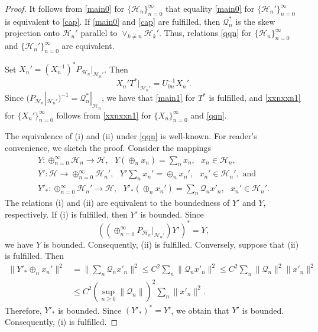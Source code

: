 \documentclass[a4paper,oneside,11pt]{amsart}
\numberwithin{equation}{section}
\theoremstyle{plain}
\theoremstyle{definition}
\begin{document}
\begin{proof}  It follows from   \eqref{main0} for  $\{\mathcal H_n\}_{n=0}^\infty$  that equality  
  \eqref{main0} for  $\{\mathcal H_n'\}_{n=0}^\infty$ is equivalent to \eqref{cap}.  
If   \eqref{main0}  and \eqref{cap} are fulfilled, then  $\mathcal Q_n^*$ is the skew projection onto $\mathcal H_n'$  parallel to $\vee_{k\neq n}\mathcal H_k'$. Thus, 
 relations \eqref{qqn} for $\{\mathcal H_n\}_{n=0}^\infty$ and $\{\mathcal H_n'\}_{n=0}^\infty$ are equivalent. 

Set $X_n'=(X_n^{-1})^*P_{\mathcal H_n}|_{\mathcal H_n'} $. Then 
$$X_n' T^*|_{\mathcal H_n'} = U_{0n}^{-1}X_n' .$$
Since $ (P_{\mathcal H_n}|_{\mathcal H_n'})^{-1}=\mathcal Q_n^*|_{\mathcal H_n}$, we have that  \eqref{main1} for $T^*$ is fulfilled, and   \eqref{xxnxxn1} for 
$\{X_n'\}_{n=0}^\infty$ follows from \eqref{xxnxxn1} for 
$\{X_n\}_{n=0}^\infty$ and  \eqref{qqn}. 

The equivalence of (i) and (ii) under \eqref{qqn} is well-known. For reader's convenience, we sketch the proof. 
Consider the mappings 
\begin{equation*}\begin{aligned}
 Y\colon\oplus_{n=0}^\infty \mathcal H_n\to\mathcal H, \ \ \ Y(\oplus_n x_n) =\sum_n x_n, \ \ \ x_n\in\mathcal H_n, \\ 
Y'\colon \mathcal H \to \oplus_{n=0}^\infty \mathcal H_n', \ \ \ Y'\sum_n x_n'=\oplus_n x_n' , \ \ \ x_n'\in\mathcal H_n', \text{ and } \\ 
 Y'_*\colon\oplus_{n=0}^\infty \mathcal H_n'\to\mathcal H, \ \ \ Y'_*(\oplus_n x_n') =\sum_n \mathcal Q_nx'_n, \ \ \ x_n'\in\mathcal H_n'. 
\end{aligned}\end{equation*}
The relations  (i) and (ii) are equivalent to the boundedness of $Y'$ and $Y$, respectively. 
If (i) is fulfilled, then  $Y'$ is bounded. Since $$((\oplus_{n=0}^\infty P_{\mathcal H_n}|_{\mathcal H_n'})Y')^* = Y,$$  
we have $Y$ is bounded. Consequently, (ii) is fulfilled. 
Conversely, suppose that (ii) is fulfilled. Then 
\begin{equation*}\begin{aligned} \|Y'_*\oplus_n x_n'\|^2 &=\|\sum_n \mathcal Q_nx'_n\|^2\leq C^2\sum_n \|\mathcal Q_nx'_n\|^2\leq  C^2 \sum_n \|\mathcal Q_n\|^2\|x'_n\|^2 \\ &
\leq C^2(\sup_{n\geq 0}\|\mathcal Q_n\|)^2 \sum_n \|x'_n\|^2.\end{aligned}\end{equation*}
Therefore, $Y'_*$ is bounded. Since $(Y'_*)^*=Y'$, we obtain that $Y'$ is bounded. Consequently, (i) is fulfilled. 
 \end{proof}
\end{document}
